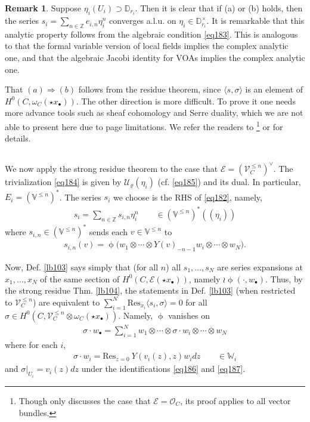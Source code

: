 \documentclass[12pt,a4paper,notitlepage]{article}
\theoremstyle{definition}
\newtheorem{rem}[df]{Remark}
\theoremstyle{plain}
\newcommand{\mc}{\mathcal}
\newcommand{\Res}{\mathrm{Res}}
\newcommand{\bk}[1]{\langle {#1}\rangle}
\newcommand{\scr}{\mathscr}
\newcommand{\blt}{\bullet}
\newcommand{\Vbb}{\mathbb V}
\newcommand{\Wbb}{\mathbb W}
\newcommand{\Zbb}{\mathbb Z}
\newcommand{\Dbb}{\mathbb D}
\numberwithin{equation}{section}
\begin{document}
\begin{rem}
Suppose $\eta_i(U_i)\supset\Dbb_{r_i}$. Then it is clear that if (a) or (b) holds, then the series $s_i=\sum_{n\in\Zbb} e_{i,n}\eta_i^n$ converges a.l.u. on $\eta_i\in\Dbb_{r_i}^\times$.  It is remarkable that this analytic property follows from the algebraic condition \eqref{eq183}. This is analogous to that the formal variable version of local fields implies the complex analytic one, and that the algebraic Jacobi identity for VOAs implies the complex analytic one.
\end{rem}

That $(a)\Rightarrow(b)$ follows from the residue theorem, since $\bk{s,\sigma}$ is an element of $H^0(C,\omega_C(\star x_\blt))$. The other direction is more difficult. To prove it one needs more advance tools  such as sheaf cohomology and Serre duality, which we are not able to present here due to page limitations. We refer the readers to \cite[Sec. 1.2.2]{Muk10}\footnote{Though \cite{Muk10} only discusses the case that $\scr E=\scr O_C$, its proof applies to all vector bundles.} or \cite[Sec. 1.4]{Gui} for details.



\subsection{}


We now apply the strong residue theorem to the case that $\scr E=(\scr V_C^{\leq n})^\vee$. The trivialization \eqref{eq184} is given by $\mc U_\varrho(\eta_i)$ (cf. \eqref{eq185}) and its dual. In particular, $E_i=(\Vbb^{\leq n})^*$. The series $s_i$  we choose is the RHS of \eqref{eq182}, namely,
\begin{align*}
s_i=\sum_{n\in\Zbb}s_{i,n}\eta_i^n\qquad \in (\Vbb^{\leq n})^*((\eta_i))
\end{align*}
where $s_{i,n}\in (\Vbb^{\leq n})^*$ sends each $v\in\Vbb^{\leq n}$ to
\begin{align*}
s_{i,n}(v)=\upphi\big(w_1\otimes\cdots\otimes Y(v)_{-n-1}w_i\otimes\cdots\otimes w_N\big).
\end{align*}


Now, Def. \ref{lb103} says simply that (for all $n$) all $s_1,\dots,s_N$ are series expansions at $x_1,\dots,x_N$ of the same section of $H^0(C,\scr E(\star x_\blt))$, namely $\wr\upphi(\cdot,w_\blt)$. Thus, by the strong residue Thm. \ref{lb104}, the statements in Def. \ref{lb103} (when restricted to $\scr V^{\leq n}_C$) are equivalent to $\sum_{i=1}^N \Res_{x_i}\bk{s_i,\sigma}=0$ for all $\sigma\in H^0(C,\scr V_C^{\leq n}\otimes\omega_C(\star x_\blt))$. Namely, $\upphi$ vanishes on
\begin{align}
\sigma\cdot w_\blt=\sum_{i=1}^N w_1\otimes\cdots \otimes \sigma\cdot w_i\otimes\cdots\otimes w_N\label{eq188}
\end{align}
where for each $i$,
\begin{gather}
\sigma\cdot w_i=\Res_{z=0} ~Y(v_i(z),z)w_idz \qquad\in\Wbb_i\label{eq190}
\end{gather}
and $\sigma|_{U_i}=v_i(z)dz$ under the identifications \eqref{eq186} and \eqref{eq187}. 
\end{document}
